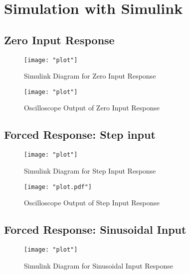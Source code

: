 \documentclass[12pt]{article}
\begin{document}
	\section{Simulation with Simulink}
		\subsection{Zero Input Response}
			\begin{figure}[H]
				\centering
				\texttt{[image: "plot"]} %
				\caption{Simulink Diagram for Zero Input Response}
				\label{fig:slx_zero_input_diagram}
			\end{figure}	
			\begin{figure}[H]
				\centering
				\texttt{[image: "plot"]} 
				\caption{Oscilloscope Output of Zero Input Response}
				\label{fig:slx_zero_input_output}
			\end{figure}
			
		\subsection{Forced Response: Step input}
			\begin{figure}[H]
				\centering
				\texttt{[image: "plot"]} %
				\caption{Simulink Diagram for Step Input Response}
				\label{fig:slx_step_input_diagram}
			\end{figure}	
			\begin{figure}[H]
				\centering
				\texttt{[image: "plot.pdf"]} 
				\caption{Oscilloscope Output of Step Input Response}
				\label{fig:slx_step_input_output}
			\end{figure}
			
		\subsection{Forced Response: Sinusoidal Input}
			\begin{figure}[H]
				\centering
				\texttt{[image: "plot"]} %
				\caption{Simulink Diagram for Sinusoidal Input Response}
				\label{fig:slx_sine_input_diagram}
			\end{figure}
		
\end{document}
